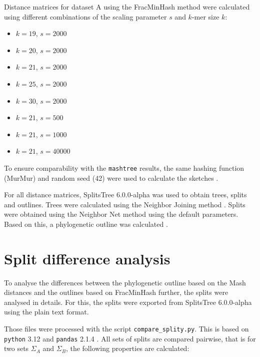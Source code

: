 Distance matrices for dataset A using the FracMinHash method were calculated using different
combinations of the scaling parameter $s$ and $k$-mer size $k$:

\begin{itemize}
  \item $k=19$, $s=2000$
  \item $k=20$, $s=2000$
  \item $k=21$, $s=2000$
  \item $k=25$, $s=2000$
  \item $k=30$, $s=2000$
  \item $k=21$, $s=500$
  \item $k=21$, $s=1000$
  \item $k=21$, $s=40000$
\end{itemize}

To ensure comparability with the \texttt{mashtree} results, the same hashing
function (MurMur) and random seed (42) were used to calculate the sketches
\cite{katzMashtreeRapidComparison2019,ondovMashFastGenome2016}.

For all distance matrices, SplitsTree 6.0.0-alpha
\cite{husonApplicationPhylogeneticNetworks2006} was used to obtain trees, splits
and outlines. Trees were calculated using the Neighbor Joining method
\cite{saitouNeighborjoiningMethodNew1987}. Splits were obtained using the
Neighbor Net method
\cite{bryantNeighborNetAgglomerativeMethod2004,bryantNeighborNetImprovedAlgorithms2023}
using the default parameters. Based on this, a phylogenetic outline was
calculated \cite{bagciMicrobialPhylogeneticContext2021}.



\section{Split difference analysis}
\label{sec:splitanalysis}
To analyse the differences between the phylogenetic outline based on the Mash
distances and the outlines based on FracMinHash further, the splits were
analysed in details. For this, the splits were exported from SplitsTree
6.0.0-alpha \cite{husonApplicationPhylogeneticNetworks2006} using the plain text
format.

Those files were processed with the script \texttt{compare\_splity.py}. This is
based on \texttt{python} 3.12 and \texttt{pandas} 2.1.4
\cite{PandasdevPandasPandas2024,mckinneyDataStructuresStatistical2010}. All sets
of splits are compared pairwise, that is for two sets $\Sigma_A$ and $\Sigma_B$,
the following properties are calculated:

